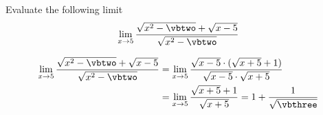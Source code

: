 



\SQUARE\vbone\vbtwo
\MULTIPLY{}\vbthree

\question[4] Evaluate the following limit \[ \lim_{x\to\vbone}\dfrac{\sqrt{x^2 -\vbtwo} + \sqrt{x-\vbone}}{\sqrt{x^2-\vbtwo}}\]

\watchout

\begin{solution}[\halfpage]
  \begin{align}
    \lim_{x\to\vbone}\dfrac{\sqrt{x^2-\vbtwo} + \sqrt{x-\vbone}}{\sqrt{x^2-\vbtwo}} &= 
    \lim_{x\to\vbone}\dfrac{\sqrt{x-\vbone}\cdot (\sqrt{x+\vbone} + 1)}{\sqrt{x-\vbone}\cdot\sqrt{x + \vbone}} \\
    &= \lim_{x\to\vbone}\dfrac{\sqrt{x+\vbone} + 1}{\sqrt{x + \vbone}} 
    = 1 + \frac{1}{\sqrt\vbthree}
  \end{align}
\end{solution}

